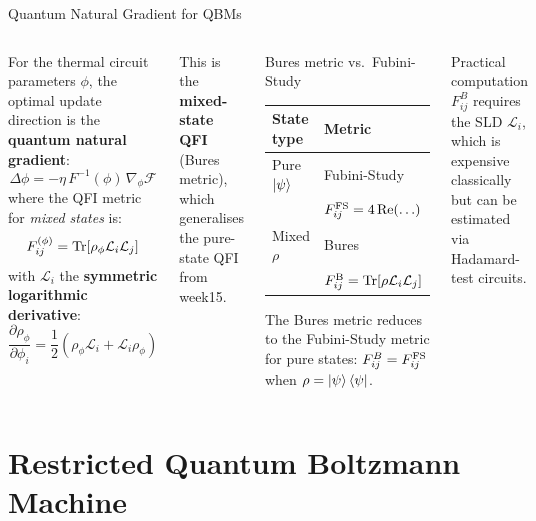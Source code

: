 \documentclass[aspectratio=169,10pt]{beamer}
\begin{document}
\begin{frame}{Quantum Natural Gradient for QBMs}
  \begin{columns}[T]
      For the thermal circuit parameters $\phi$, the optimal
      update direction is the \textbf{quantum natural gradient}:
      \[
        \Delta\phi = -\eta\,F^{-1}(\phi)\,\nabla_\phi\mathcal{F}
      \]
      where the QFI metric for \emph{mixed states} is:
      \[
        F_{ij}^{(\phi)}
        = \Tr\!\left[\rho_\phi \mathcal{L}_i\mathcal{L}_j\right]
      \]
      with $\mathcal{L}_i$ the \textbf{symmetric logarithmic derivative}:
      \[
        \frac{\partial\rho_\phi}{\partial\phi_i}
        = \frac{1}{2}(\rho_\phi\mathcal{L}_i + \mathcal{L}_i\rho_\phi)
      \]

      This is the \textbf{mixed-state QFI} (Bures metric), which
      generalises the pure-state QFI from week15.
      \begin{block}{Bures metric vs.\ Fubini-Study}
        \begin{tabular}{ll}
          \toprule
          State type & Metric \\
          \midrule
          Pure $\ket{\psi}$ & Fubini-Study \\
                            & $F_{ij}^{\rm FS} = 4\,\mathrm{Re}(\ldots)$ \\
          Mixed $\rho$ & Bures \\
                       & $F_{ij}^{\rm B} = \Tr[\rho\mathcal{L}_i\mathcal{L}_j]$ \\
          \bottomrule
        \end{tabular}
        \vspace{0.2cm}

        The Bures metric reduces to the Fubini-Study metric
        for pure states: $F_{ij}^B = F_{ij}^{\rm FS}$ when
        $\rho = \ket{\psi}\bra{\psi}$.
      \end{block}
      \vspace{0.2cm}
      \begin{alertblock}{Practical computation}
        $F^B_{ij}$ requires the SLD $\mathcal{L}_i$, which is
        expensive classically but can be estimated via
        Hadamard-test circuits.
      \end{alertblock}
  \end{columns}
\end{frame}

\section{Restricted Quantum Boltzmann Machine}
\end{document}
